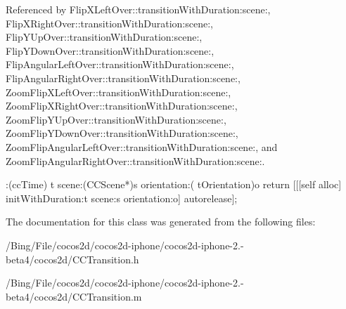 Referenced by Flip\-X\-Left\-Over\-::transition\-With\-Duration\-:scene\-:, Flip\-X\-Right\-Over\-::transition\-With\-Duration\-:scene\-:, Flip\-Y\-Up\-Over\-::transition\-With\-Duration\-:scene\-:, Flip\-Y\-Down\-Over\-::transition\-With\-Duration\-:scene\-:, Flip\-Angular\-Left\-Over\-::transition\-With\-Duration\-:scene\-:, Flip\-Angular\-Right\-Over\-::transition\-With\-Duration\-:scene\-:, Zoom\-Flip\-X\-Left\-Over\-::transition\-With\-Duration\-:scene\-:, Zoom\-Flip\-X\-Right\-Over\-::transition\-With\-Duration\-:scene\-:, Zoom\-Flip\-Y\-Up\-Over\-::transition\-With\-Duration\-:scene\-:, Zoom\-Flip\-Y\-Down\-Over\-::transition\-With\-Duration\-:scene\-:, Zoom\-Flip\-Angular\-Left\-Over\-::transition\-With\-Duration\-:scene\-:, and Zoom\-Flip\-Angular\-Right\-Over\-::transition\-With\-Duration\-:scene\-:.


\begin{DoxyCode}
                            :(ccTime) t scene:(CCScene*)s orientation:(
      tOrientation)o
{
        return [[[self alloc] initWithDuration:t scene:s orientation:o] 
      autorelease];
}
\end{DoxyCode}


The documentation for this class was generated from the following files\-:\begin{DoxyCompactItemize}
\item 
/\-Bing/\-File/cocos2d/cocos2d-\/iphone/cocos2d-\/iphone-\/2.-\/beta4/cocos2d/C\-C\-Transition.\-h\item 
/\-Bing/\-File/cocos2d/cocos2d-\/iphone/cocos2d-\/iphone-\/2.-\/beta4/cocos2d/C\-C\-Transition.\-m\end{DoxyCompactItemize}
